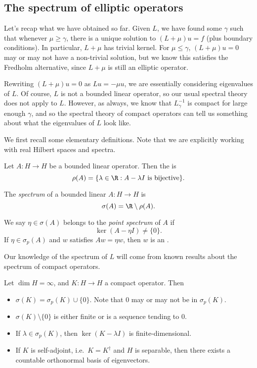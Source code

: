 \documentclass[a4paper]{article}
\begin{document}
\subsection{The spectrum of elliptic operators}
Let's recap what we have obtained so far. Given $L$, we have found some $\gamma$ such that whenever $\mu \geq \gamma$, there is a unique solution to $(L + \mu) u = f$ (plus boundary conditions). In particular, $L + \mu$ has trivial kernel. For $\mu \leq \gamma$, $(L + \mu) u = 0$ may or may not have a non-trivial solution, but we know this satisfies the Fredholm alternative, since $L + \mu$ is still an elliptic operator.

Rewriting $(L + \mu)u = 0$ as $Lu = - \mu u$, we are essentially considering eigenvalues of $L$. Of course, $L$ is not a bounded linear operator, so our usual spectral theory does not apply to $L$. However, as always, we know that $L_\gamma^{-1}$ is compact for large enough $\gamma$, and so the spectral theory of compact operators can tell us something about what the eigenvalues of $L$ look like.

We first recall some elementary definitions. Note that we are explicitly working with real Hilbert spaces and spectra.
\begin{defi}
  Let $A: H \to H$ be a bounded linear operator. Then the  is
  \[
    \rho(A) = \{\lambda \in \R: A - \lambda I\text{ is bijective}\}.
  \]
\end{defi}

\begin{defi}[Spectrum]
  The \emph{spectrum} of a bounded linear $A: H \to H$ is
  \[
    \sigma(A) = \R \setminus \rho(A).
  \]
\end{defi}

\begin{defi}
  We say $\eta \in \sigma (A)$ belongs to the \emph{point spectrum} of $A$ if
  \[
    \ker (A - \eta I) \not= \{0\}.
  \]
  If $\eta \in \sigma_p(A)$ and $w$ satisfies $A w = \eta w$, then $w$ is an .
\end{defi}

Our knowledge of the spectrum of $L$ will come from known results about the spectrum of compact operators.
\begin{thm}
  Let $\dim H = \infty$, and $K: H \to H$ a compact operator. Then
  \begin{itemize}
    \item $\sigma(K) = \sigma_p(K) \cup \{0\}$. Note that $0$ may or may not be in $\sigma_p(K)$.
    \item $\sigma(K) \setminus \{0\}$ is either finite or is a sequence tending to $0$.
    \item If $\lambda \in \sigma_p(K)$, then $\ker (K - \lambda I)$ is finite-dimensional.
    \item If $K$ is self-adjoint, i.e.\ $K = K^\dagger$ and $H$ is separable, then there exists a countable orthonormal basis of eigenvectors.
  \end{itemize}
\end{thm}
\end{document}
